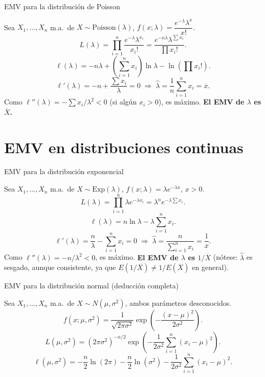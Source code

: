 \documentclass[aspectratio=169,11pt]{beamer}
\begin{document}
\begin{frame}{EMV para la distribución de Poisson}
\begin{example}
Sea $X_1,\dots,X_n$ m.a.\ de $X\sim \text{Poisson}(\lambda)$, $f(x;\lambda)=\dfrac{e^{-\lambda}\lambda^x}{x!}$.
\[
L(\lambda) = \prod_{i=1}^n \frac{e^{-\lambda}\lambda^{x_i}}{x_i!} = \frac{e^{-n\lambda}\lambda^{\sum x_i}}{\prod x_i!}.
\]
\[
\ell(\lambda) = -n\lambda + \left(\sum_{i=1}^n x_i\right)\ln\lambda - \ln\left(\prod x_i!\right).
\]
\[
\ell'(\lambda) = -n + \frac{\sum x_i}{\lambda} = 0 \;\Longrightarrow\; \widehat\lambda = \frac{1}{n}\sum_{i=1}^n x_i = \overline x.
\]
Como $\ell''(\lambda) = -\sum x_i/\lambda^2 < 0$ (si algún $x_i>0$), es máximo. \textbf{El EMV de $\lambda$ es $\overline X$.}
\end{example}
\end{frame}

\section{EMV en distribuciones continuas}

\begin{frame}{EMV para la distribución exponencial}
\begin{example}
Sea $X_1,\dots,X_n$ m.a.\ de $X\sim \text{Exp}(\lambda)$, $f(x;\lambda)=\lambda e^{-\lambda x}$, $x>0$.
\[
L(\lambda) = \prod_{i=1}^n \lambda e^{-\lambda x_i} = \lambda^n e^{-\lambda \sum x_i}.
\]
\[
\ell(\lambda) = n\ln\lambda - \lambda\sum_{i=1}^n x_i.
\]
\[
\ell'(\lambda) = \frac{n}{\lambda} - \sum_{i=1}^n x_i = 0 \;\Longrightarrow\; \widehat\lambda = \frac{n}{\sum_{i=1}^n x_i} = \frac{1}{\overline x}.
\]
Como $\ell''(\lambda)=-n/\lambda^2<0$, es máximo. \textbf{El EMV de $\lambda$ es $1/\overline X$} (nótese: $\widehat\lambda$ es sesgado, aunque consistente, ya que $E(1/\overline X)\neq 1/E(\overline X)$ en general).
\end{example}
\end{frame}

\begin{frame}{EMV para la distribución normal (deducción completa)}
\begin{example}
Sea $X_1,\dots,X_n$ m.a.\ de $X\sim N(\mu,\sigma^2)$, ambos parámetros desconocidos.
\[
f(x;\mu,\sigma^2) = \frac{1}{\sqrt{2\pi\sigma^2}}\exp\left(-\frac{(x-\mu)^2}{2\sigma^2}\right).
\]
\[
L(\mu,\sigma^2) = (2\pi\sigma^2)^{-n/2}\exp\left(-\frac{1}{2\sigma^2}\sum_{i=1}^n (x_i-\mu)^2\right).
\]
\[
\ell(\mu,\sigma^2) = -\frac{n}{2}\ln(2\pi) - \frac{n}{2}\ln(\sigma^2) - \frac{1}{2\sigma^2}\sum_{i=1}^n (x_i-\mu)^2.
\]
\end{example}
\end{frame}
\end{document}
